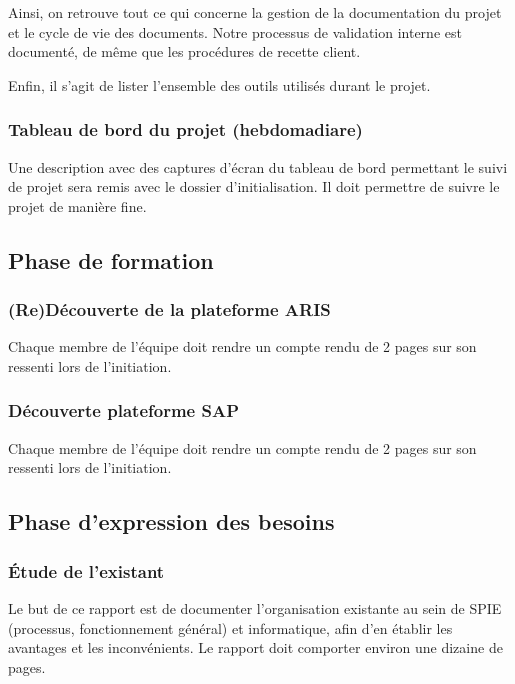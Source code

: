 Ainsi, on retrouve tout ce qui concerne la gestion de la documentation du projet et le cycle de vie des documents. Notre processus de validation interne est documenté, de même que les procédures de recette client.

Enfin, il s’agit de lister l’ensemble des outils utilisés durant le projet.

\subsubsection{Tableau de bord du projet (hebdomadiare)}

Une description avec des captures d’écran du tableau de bord permettant le suivi de projet sera remis avec le dossier d’initialisation. Il doit permettre de suivre le projet de manière fine.

\subsection{Phase de formation}

\subsubsection{(Re)Découverte de la plateforme ARIS}

Chaque membre de l’équipe doit rendre un compte rendu de 2 pages sur son ressenti lors de l’initiation.

\subsubsection{Découverte plateforme SAP}

Chaque membre de l’équipe doit rendre un compte rendu de 2 pages sur son ressenti lors de l’initiation.

\subsection{Phase d’expression des besoins}

\subsubsection{Étude de l'existant}

Le but de ce rapport est de documenter l’organisation existante au sein de SPIE (processus, fonctionnement général) et informatique, afin d’en établir les avantages et les inconvénients.
Le rapport doit comporter environ une dizaine de pages.

